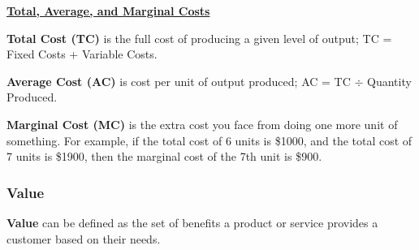 \underline{\textbf{Total, Average, and Marginal Costs}}

\textbf{Total Cost (TC)} is the full cost of producing a given level of output; TC = Fixed Costs + Variable Costs.

\textbf{Average Cost (AC)} is cost per unit of output produced; AC = TC $\div$ Quantity Produced.

\textbf{Marginal Cost (MC)} is the extra cost you face from doing one more unit of something. For example, if the total cost of 6 units is \$1000, and the total cost of 7 units is \$1900, then the marginal cost of the 7th unit is \$900.


\subsubsection{Value}

\textbf{Value} can be defined as the set of benefits a product or service provides a customer based on their needs.  